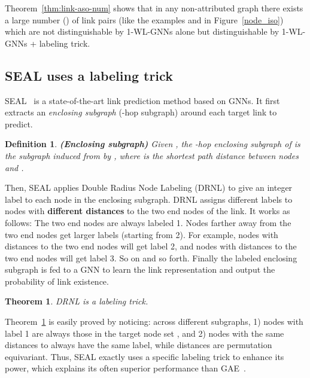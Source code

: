 \documentclass{article}
\newtheorem{theorem}{Theorem}
\newtheorem{definition}{Definition}
\begin{document}
Theorem~\ref{thm:link-aso-num} shows that in any non-attributed graph there exists a large number () of link pairs (like the examples  and  in Figure~\ref{node_iso}) which are not distinguishable by 1-WL-GNNs alone but distinguishable by 1-WL-GNNs + labeling trick.












\subsection{SEAL uses a labeling trick}


SEAL~\citep{zhang2018link} is a state-of-the-art link prediction method based on GNNs. It first extracts an \textit{enclosing subgraph} (-hop subgraph) around each target link to predict.

\begin{definition}
\textbf{(Enclosing subgraph)} Given , the -hop enclosing subgraph  of  is the subgraph induced from  by , where  is the shortest path distance between nodes  and . 
\end{definition}

Then, SEAL applies Double Radius Node Labeling (DRNL) to give an integer label to each node in the enclosing subgraph. DRNL assigns different labels to nodes with \textbf{different distances} to the two end nodes of the link. It works as follows: The two end nodes are always labeled 1. Nodes farther away from the two end nodes get larger labels (starting from 2). For example, nodes with distances  to the two end nodes will get label 2, and nodes with distances  to the two end nodes will get label 3. So on and so forth. Finally the labeled enclosing subgraph is fed to a GNN to learn the link representation and output the probability of link existence. 

\begin{theorem}\label{drnlthm}
DRNL is a labeling trick.
\end{theorem}

Theorem~\ref{drnlthm} is easily proved by noticing: across different subgraphs, 1) nodes with label 1 are always those in the target node set , and 2) nodes with the same distances to  always have the same label, while distances are permutation equivariant. Thus, SEAL exactly uses a specific labeling trick to enhance its power, which explains its often superior performance than GAE~\citep{zhang2018link}. 
\end{document}
